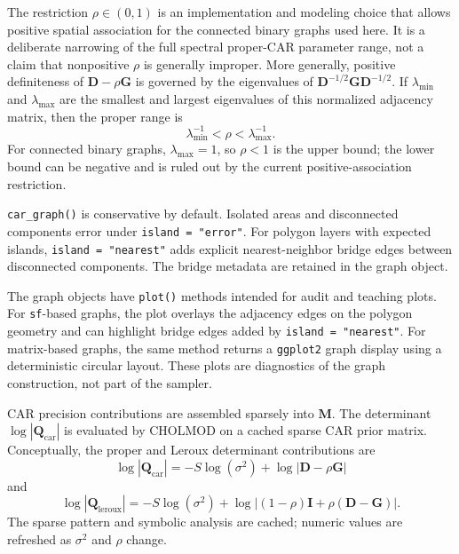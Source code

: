 \documentclass[11pt]{article}
\newcommand{\bD}{\bm{D}}
\newcommand{\bG}{\bm{G}}
\newcommand{\bI}{\bm{I}}
\newcommand{\bM}{\bm{M}}
\newcommand{\bQ}{\bm{Q}}
\begin{document}
The restriction $\rho\in(0,1)$ is an implementation and modeling choice that allows positive spatial association for the connected binary graphs used here. It is a deliberate narrowing of the full spectral proper-CAR parameter range, not a claim that nonpositive $\rho$ is generally improper. More generally, positive definiteness of $\bD-\rho\bG$ is governed by the eigenvalues of $\bD^{-1/2}\bG\bD^{-1/2}$. If $\lambda_{\min}$ and $\lambda_{\max}$ are the smallest and largest eigenvalues of this normalized adjacency matrix, then the proper range is
\begin{equation}
  \lambda_{\min}^{-1} < \rho < \lambda_{\max}^{-1}.
\end{equation}
For connected binary graphs, $\lambda_{\max}=1$, so $\rho<1$ is the upper bound; the lower bound can be negative and is ruled out by the current positive-association restriction.

\texttt{car\_graph()} is conservative by default. Isolated areas and disconnected components error under \texttt{island = "error"}. For polygon layers with expected islands, \texttt{island = "nearest"} adds explicit nearest-neighbor bridge edges between disconnected components. The bridge metadata are retained in the graph object.

The graph objects have \texttt{plot()} methods intended for audit and teaching plots. For \texttt{sf}-based graphs, the plot overlays the adjacency edges on the polygon geometry and can highlight bridge edges added by \texttt{island = "nearest"}. For matrix-based graphs, the same method returns a \texttt{ggplot2} graph display using a deterministic circular layout. These plots are diagnostics of the graph construction, not part of the sampler.

CAR precision contributions are assembled sparsely into $\bM$. The determinant $\log|\bQ_{\mathrm{car}}|$ is evaluated by CHOLMOD on a cached sparse CAR prior matrix. Conceptually, the proper and Leroux determinant contributions are
\begin{equation}
  \label{eq:logdet-car}
  \log|\bQ_{\mathrm{car}}|
  =
  -S\log(\sigma^2) + \log|\bD-\rho\bG|
\end{equation}
and
\begin{equation}
  \label{eq:logdet-leroux}
  \log|\bQ_{\mathrm{leroux}}|
  =
  -S\log(\sigma^2)
  + \log|(1-\rho)\bI+\rho(\bD-\bG)|.
\end{equation}
The sparse pattern and symbolic analysis are cached; numeric values are refreshed as $\sigma^2$ and $\rho$ change.
\end{document}
